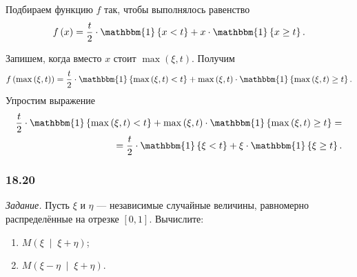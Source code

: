 \begin{enumerate}[label=\alph*)]
  Подбираем функцию $f$ так, чтобы выполнялось равенство
  $$f \left( x \right) =
    \frac{t}{2} \cdot \mathbbm{1} \left\{ x < t \right\} +
    x \cdot \mathbbm{1} \left\{ x \geq t \right\}.$$

  Запишем, когда вместо $x$ стоит $ \max \left( \xi, t \right) $.
  Получим
  $$f \left( \max \left( \xi, t \right) \right) =
    \frac{t}{2} \cdot \mathbbm{1} \left\{ \max \left( \xi, t \right) < t \right\} +
    \max \left( \xi, t \right) \cdot
    \mathbbm{1} \left\{ \max \left( \xi, t \right) \geq t \right\}.$$
  Упростим выражение
  \begin{equation*}
    \begin{split}
      \frac{t}{2} \cdot \mathbbm{1} \left\{ \max \left( \xi, t \right) < t \right\} +
      \max \left( \xi, t \right) \cdot
      \mathbbm{1} \left\{ \max \left( \xi, t \right) \geq t \right\} = \\
      = \frac{t}{2} \cdot \mathbbm{1} \left\{ \xi < t \right\} +
      \xi \cdot \mathbbm{1} \left\{ \xi \geq t \right\}.
    \end{split}
  \end{equation*}
\end{enumerate}

\subsubsection{18.20}

\textit{Задание.}
Пусть $ \xi $ и $ \eta $ --- независимые случайные величины,
равномерно распределённые на отрезке $ \left[ 0, 1 \right] $.
Вычислите:
\begin{enumerate}[label=\alph*)]
  \item $M \left( \xi \; \middle| \; \xi + \eta \right) $;
  \item $M \left( \xi - \eta \; \middle| \; \xi + \eta \right) $.
\end{enumerate}

